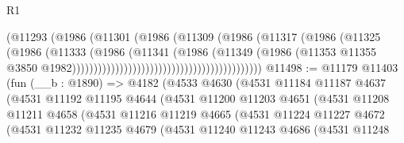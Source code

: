 \begin{lexlean}{R1}
\begin{coremodule}
                                                          (@11293
                                                            (@1986
                                                              (@11301
                                                                (@1986
                                                                  (@11309
                                                                    (@1986
                                                                      (@11317
                                                                        (@1986
                                                                          (@11325
                                                                            (@1986
                                                                              (@11333
                                                                                (@1986
                                                                                  (@11341
                                                                                    (@1986
                                                                                      (@11349
                                                                                        (@1986
                                                                                          (@11353
                                                                                            @11355
                                                                                            @3850
                                                                                            @1982))))))))))))))))))))))))))))))))))))))))))))
@11498 := @11179
    @11403
    (fun (__b : @1890) =>
    @4182
      (@4533
        @4630
        (@4531
          @11184
          @11187
          @4637
          (@4531
            @11192
            @11195
            @4644
            (@4531
              @11200
              @11203
              @4651
              (@4531
                @11208
                @11211
                @4658
                (@4531
                  @11216
                  @11219
                  @4665
                  (@4531
                    @11224
                    @11227
                    @4672
                    (@4531
                      @11232
                      @11235
                      @4679
                      (@4531
                        @11240
                        @11243
                        @4686
                        (@4531
                          @11248

\end{coremodule}
\end{lexlean}

